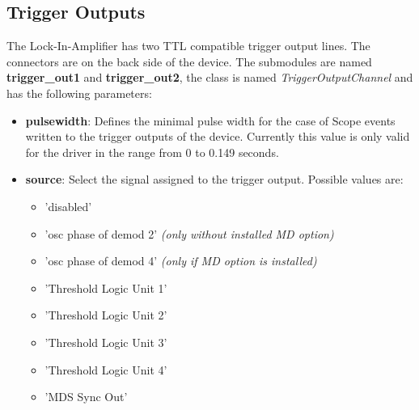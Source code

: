 \documentclass[11pt]{article} %
\begin{document}
\subsection{Trigger Outputs}
The Lock-In-Amplifier has two TTL compatible trigger output lines. The connectors are on the back side of the device. The submodules are named {\bf trigger\_out1} and {\bf trigger\_out2}, the class is named {\it TriggerOutputChannel} and has the following parameters:
\begin{itemize}
\item {\bf pulsewidth}: Defines the minimal pulse width for the case of Scope events written to the trigger outputs of the device. Currently this value is only valid for the driver in the range from 0 to 0.149 seconds.
\item {\bf source}: Select the signal assigned to the trigger output. Possible values are:
	\begin{itemize}[ ]
	\itemsep0pt
	\item 'disabled'
	\item 'osc phase of demod 2' {\it (only without installed MD option)}
	\item 'osc phase of demod 4' {\it (only if MD option is installed)}
	\item 'Threshold Logic Unit 1'
	\item 'Threshold Logic Unit 2'
	\item 'Threshold Logic Unit 3'
	\item 'Threshold Logic Unit 4'
	\item 'MDS Sync Out'
  	\end{itemize}
\end{itemize}
\end{document}
